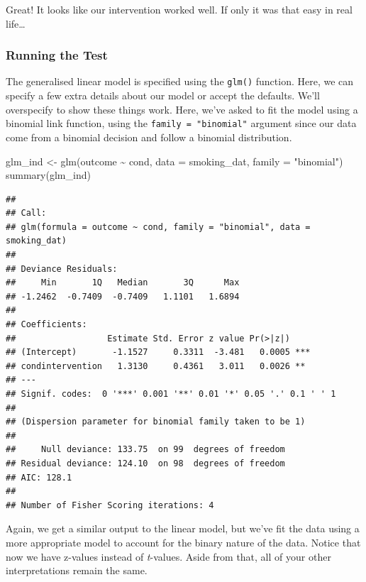 \documentclass[
]{book}
\newenvironment{Shaded}{\begin{snugshade}}{\end{snugshade}}
\newcommand{\AttributeTok}[1]{\textcolor[rgb]{0.77,0.63,0.00}{#1}}
\newcommand{\FunctionTok}[1]{\textcolor[rgb]{0.00,0.00,0.00}{#1}}
\newcommand{\NormalTok}[1]{#1}
\newcommand{\OtherTok}[1]{\textcolor[rgb]{0.56,0.35,0.01}{#1}}
\newcommand{\SpecialCharTok}[1]{\textcolor[rgb]{0.00,0.00,0.00}{#1}}
\newcommand{\StringTok}[1]{\textcolor[rgb]{0.31,0.60,0.02}{#1}}
\begin{document}
Great! It looks like our intervention worked well. If only it was that easy in real life\ldots{}

\hypertarget{running-the-test-5}{%
\subsubsection{Running the Test}\label{running-the-test-5}}

The generalised linear model is specified using the \texttt{glm()} function. Here, we can specify a few extra details about our model or accept the defaults. We'll overspecify to show these things work. Here, we've asked to fit the model using a binomial link function, using the \texttt{family\ =\ "binomial"} argument since our data come from a binomial decision and follow a binomial distribution.

\begin{Shaded}
\begin{Highlighting}[]
\NormalTok{glm\_ind }\OtherTok{\textless{}{-}} \FunctionTok{glm}\NormalTok{(outcome }\SpecialCharTok{\textasciitilde{}}\NormalTok{ cond, }\AttributeTok{data =}\NormalTok{ smoking\_dat, }\AttributeTok{family =} \StringTok{"binomial"}\NormalTok{)}
\FunctionTok{summary}\NormalTok{(glm\_ind)}
\end{Highlighting}
\end{Shaded}

\begin{verbatim}
## 
## Call:
## glm(formula = outcome ~ cond, family = "binomial", data = smoking_dat)
## 
## Deviance Residuals: 
##     Min       1Q   Median       3Q      Max  
## -1.2462  -0.7409  -0.7409   1.1101   1.6894  
## 
## Coefficients:
##                  Estimate Std. Error z value Pr(>|z|)    
## (Intercept)       -1.1527     0.3311  -3.481   0.0005 ***
## condintervention   1.3130     0.4361   3.011   0.0026 ** 
## ---
## Signif. codes:  0 '***' 0.001 '**' 0.01 '*' 0.05 '.' 0.1 ' ' 1
## 
## (Dispersion parameter for binomial family taken to be 1)
## 
##     Null deviance: 133.75  on 99  degrees of freedom
## Residual deviance: 124.10  on 98  degrees of freedom
## AIC: 128.1
## 
## Number of Fisher Scoring iterations: 4
\end{verbatim}

Again, we get a similar output to the linear model, but we've fit the data using a more appropriate model to account for the binary nature of the data. Notice that now we have z-values instead of \emph{t}-values. Aside from that, all of your other interpretations remain the same.
\end{document}
